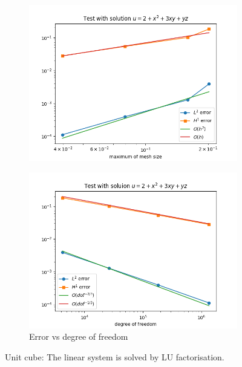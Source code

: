 \documentclass[12pt]{article}%
\theoremstyle{plain}
\numberwithin{equation}{section}
\begin{document}
\begin{figure}[H]
\begin{subfigure}[h]{0.45\linewidth}
\includegraphics[width=\linewidth]{figures/Ex2/Ex2_test_2_LU.png}
\end{subfigure}
    \begin{subfigure}[h]{0.45\linewidth}
     \caption{Error vs degree of freedom}
\includegraphics[width=\linewidth]{figures/Ex2/Ex2_test_2_dof_LU.png}
\end{subfigure}
  \caption{Unit cube: The linear system is solved by  LU factorisation. }
  \label{fig:Ex2_test}
 \end{figure}
\end{document}
